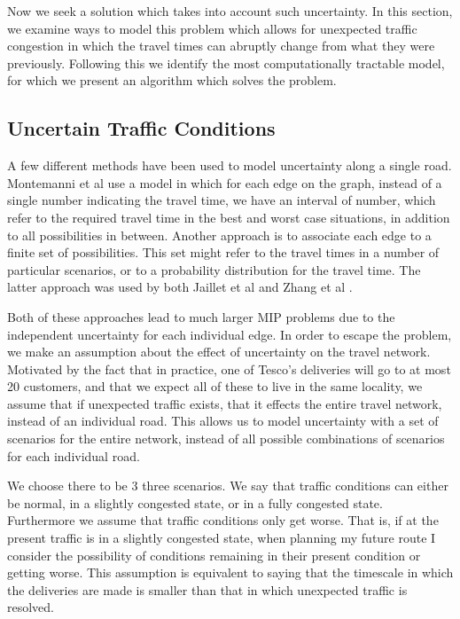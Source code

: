 Now we seek a solution which takes into account such uncertainty. In this section, we examine ways to model this problem which allows for unexpected traffic congestion in which the travel times can abruptly change from what they were previously. Following this we identify the most computationally tractable model, for which we present an algorithm which solves the problem.   


\subsection{Uncertain Traffic Conditions}
A few different methods have been used to model uncertainty along a single road. Montemanni et al \cite{montemanni2007robust} use a model in which for each edge on the graph, instead of a single number indicating the travel time, we have an interval of number, which refer to the required travel time in the best and worst case situations, in addition to all possibilities in between. Another approach is to associate each edge to a finite set of possibilities. This set might refer to the travel times in a number of particular scenarios, or to a probability distribution for the travel time. The latter approach was used by both Jaillet et al \cite{jaillet2016routing} and Zhang et al \cite{zhangrouting}.

Both of these approaches lead to much larger MIP problems due to the independent uncertainty for each individual edge. In order to escape the problem, we make an assumption about the effect of uncertainty on the travel network. Motivated by the fact that in practice, one of Tesco's deliveries will go to at most 20 customers, and that we expect all of these to live in the same locality, we assume that if unexpected traffic exists, that it effects the entire travel network, instead of an individual road. This allows us to model uncertainty with a set of scenarios for the entire network, instead of all possible combinations of scenarios for each individual road.

We choose there to be 3  three scenarios. We say that traffic conditions can either be normal, in a slightly congested state, or in a fully congested state. Furthermore we assume that traffic conditions only get worse. That is, if at the present traffic is in a slightly congested state, when planning my future route I consider the possibility of conditions remaining in their present condition or getting worse. This assumption is equivalent to saying that the timescale in which the deliveries are made is smaller than that in which unexpected traffic is resolved.

